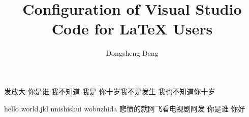\documentclass[UTF8]{ctexart}
\author{Dongsheng Deng}
\title{Configuration of Visual Studio Code for LaTeX Users}
\begin{document}
\maketitle
发放大
你是谁
我不知道
我是
你十岁我不是发生 
我也不知道你十岁

hello world.jkl
nnishishui wobuzhida 
悲愤的就阿飞看电视剧阿发
你是谁
你好
\end{document}
